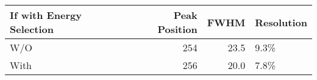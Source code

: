 \begin{tabular}{lrrl}
\toprule
If with Energy Selection &  Peak Position &  FWHM & Resolution \\
\midrule
                     W/O &            254 &  23.5 &       9.3\% \\
                    With &            256 &  20.0 &       7.8\% \\
\bottomrule
\end{tabular}
